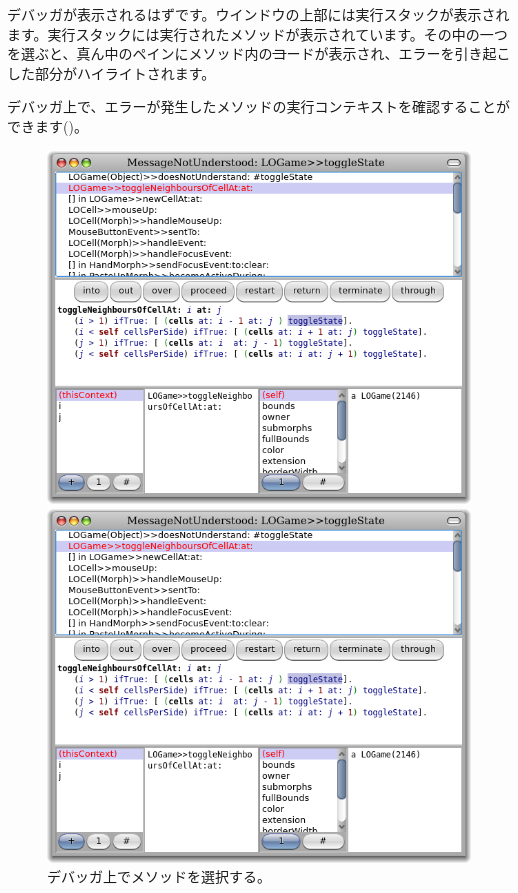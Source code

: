 \documentclass[a4paper,10pt,twoside]{book}
\begin{document}

デバッガが表示されるはずです。ウインドウの上部には実行スタックが表示されます。実行スタックには実行されたメソッドが表示されています。その中の一つを選ぶと、真ん中のペインにメソッド内の\st コードが表示され、エラーを引き起こした部分がハイライトされます。


デバッガ上で、エラーが発生したメソッドの実行コンテキストを確認することができます()。

\begin{figure}[ht]
\ifluluelse
	{\centerline {\includegraphics[width=\textwidth]{Debugger}}}
	{\centerline {\includegraphics[scale=0.7]{Debugger}}}
\caption{デバッガ上でメソッドを選択する。
}
\end{figure}
\end{document}
